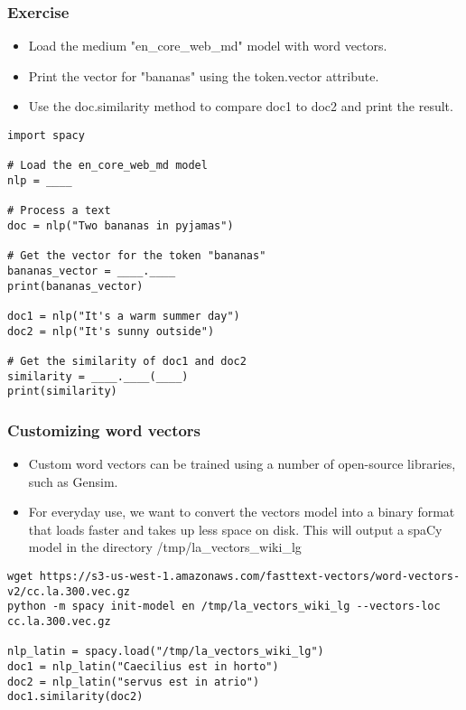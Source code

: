 \begin{frame}[fragile]\frametitle{Exercise}

\begin{itemize}
\item Load the medium "en_core_web_md" model with word vectors.
\item Print the vector for "bananas" using the token.vector attribute.
\item Use the doc.similarity method to compare doc1 to doc2 and print the result.

\end{itemize}


\begin{lstlisting}
import spacy

# Load the en_core_web_md model
nlp = ____

# Process a text
doc = nlp("Two bananas in pyjamas")

# Get the vector for the token "bananas"
bananas_vector = ____.____
print(bananas_vector)

doc1 = nlp("It's a warm summer day")
doc2 = nlp("It's sunny outside")

# Get the similarity of doc1 and doc2
similarity = ____.____(____)
print(similarity)
\end{lstlisting}


\end{frame}


\begin{frame}[fragile]\frametitle{Customizing word vectors}

\begin{itemize}
\item Custom word vectors can be trained using a number of open-source libraries, such as Gensim.
\item For everyday use, we want to convert the vectors model into a binary format that loads faster and takes up less space on disk.
This will output a spaCy model in the directory /tmp/la\_vectors\_wiki\_lg
\end{itemize}

\begin{lstlisting}
wget https://s3-us-west-1.amazonaws.com/fasttext-vectors/word-vectors-v2/cc.la.300.vec.gz
python -m spacy init-model en /tmp/la_vectors_wiki_lg --vectors-loc cc.la.300.vec.gz

nlp_latin = spacy.load("/tmp/la_vectors_wiki_lg")
doc1 = nlp_latin("Caecilius est in horto")
doc2 = nlp_latin("servus est in atrio")
doc1.similarity(doc2)
\end{lstlisting}


\end{frame}

